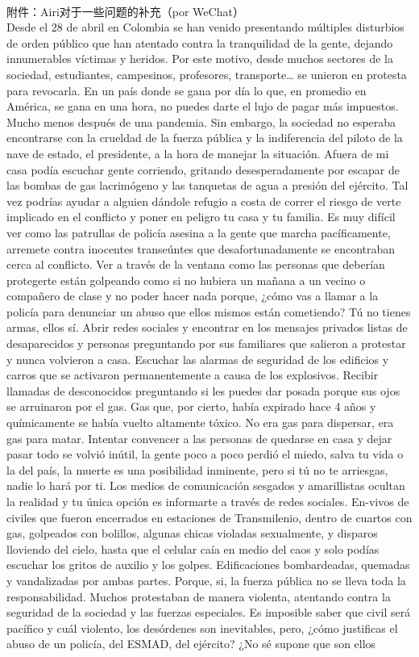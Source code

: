 \documentclass{phyasgn}\usepackage{nag}
\begin{document}
\\
附件：Airi对于一些问题的补充（por WeChat）\\
Desde el 28 de abril en Colombia se han venido presentando múltiples disturbios de orden público que han atentado contra la tranquilidad de la gente, dejando innumerables víctimas y heridos. Por este motivo, desde muchos sectores de la sociedad, estudiantes, campesinos, profesores, transporte… se unieron en protesta para revocarla. En un país donde se gana por día lo que, en promedio en América, se gana en una hora, no puedes darte el lujo de pagar más impuestos. Mucho menos después de una pandemia. Sin embargo, la sociedad no esperaba encontrarse con la crueldad de la fuerza pública y la indiferencia del piloto de la nave de estado, el presidente, a la hora de manejar la situación. Afuera de mi casa podía escuchar gente corriendo, gritando desesperadamente por escapar de las bombas de gas lacrimógeno y las tanquetas de agua a presión del ejército. Tal vez podrías ayudar a alguien dándole refugio a costa de correr el riesgo de verte implicado en el conflicto y poner en peligro tu casa y tu familia. Es muy difícil ver como las patrullas de policía asesina a la gente que marcha pacíficamente, arremete contra inocentes transeúntes que desafortunadamente se encontraban cerca al conflicto. Ver a través de la ventana como las personas que deberían protegerte están golpeando como si no hubiera un mañana a un vecino o compañero de clase y no poder hacer nada porque, ¿cómo vas a llamar a la policía para denunciar un abuso que ellos mismos están cometiendo? Tú no tienes armas, ellos sí. Abrir redes sociales y encontrar en los mensajes privados listas de desaparecidos y personas preguntando por sus familiares que salieron a protestar y nunca volvieron a casa. Escuchar las alarmas de seguridad de los edificios y carros que se activaron permanentemente a causa de los explosivos. Recibir llamadas de desconocidos preguntando si les puedes dar posada porque sus ojos se arruinaron por el gas. Gas que, por cierto, había expirado hace 4 años y químicamente se había vuelto altamente tóxico. No era gas para dispersar, era gas para matar. Intentar convencer a las personas de quedarse en casa y dejar pasar todo se volvió inútil, la gente poco a poco perdió el miedo, salva tu vida o la del país, la muerte es una posibilidad inminente, pero si tú no te arriesgas, nadie lo hará por ti. Los medios de comunicación sesgados y amarillistas ocultan la realidad y tu única opción es informarte a través de redes sociales. En-vivos de civiles que fueron encerrados en estaciones de Transmilenio, dentro de cuartos con gas, golpeados con bolillos, algunas chicas violadas sexualmente, y disparos lloviendo del cielo, hasta que el celular caía en medio del caos y solo podías escuchar los gritos de auxilio y los golpes. Edificaciones bombardeadas, quemadas y vandalizadas por ambas partes. Porque, si, la fuerza pública no se lleva toda la responsabilidad. Muchos protestaban de manera violenta, atentando contra la seguridad de la sociedad y las fuerzas especiales. Es imposible saber que civil será pacífico y cuál violento, los desórdenes son inevitables, pero, ¿cómo justificas el abuso de un policía, del ESMAD, del ejército? ¿No sé supone que son ellos 
\end{document}
